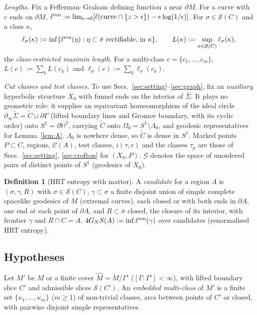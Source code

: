 \documentclass[aps,prd,onecolumn,superscriptaddress,nofootinbib,amsmath,amssymb,11pt]{revtex4-2}
\theoremstyle{definition}
\newtheorem{definition}[theorem]{Definition}
\newcommand{\Hyp}{\mathbb{H}^2}
\newcommand{\Cut}{\mathcal{C}}
\newcommand{\eps}{\epsilon}
\newcommand{\G}{\mathcal{G}}
\begin{document}
\emph{Lengths.} Fix a Fefferman--Graham defining function $z$ near $\partial M$. For a curve with $e$ ends on $\partial M$,
$\ell^{\rm ren}:=\lim_{\eps\to0}[\ell(\text{curve}\cap\{z>\eps\})-e\log(1/\eps)]$. For $\sigma\in\mathcal S(C)$ and a class
$\kappa$,
\[
\ell_\sigma(\kappa):=\inf\{\ell^{\rm ren}(\eta):\eta\subset\bar\sigma\ \text{rectifiable, in }\kappa\},\qquad
L(\kappa):=\sup_{\sigma\in\mathcal S(C)}\ell_\sigma(\kappa),
\]
the \emph{class-restricted maximin length}. For a multi-class $c=\{c_1,\dots,c_m\}$, $L(c):=\sum_kL(c_k)$ and
$\ell_\sigma(c):=\sum_k\ell_\sigma(c_k)$.

\emph{Cut classes and test classes.} To use Secs.~\ref{sec:setting}--\ref{sec:graph}, fix an \emph{auxiliary} hyperbolic
structure $X_0$ with funnel ends on the interior of $\bar\Sigma$. It plays no geometric role: it supplies an equivariant
homeomorphism of the ideal circle $\partial_\infty\tilde\Sigma=\tilde C\sqcup\partial\Gamma$ (lifted boundary lines and
Gromov boundary, with its cyclic order) onto $S^1=\partial\Hyp$, carrying $\tilde C$ onto $\Omega_0=S^1\setminus\Lambda_0$,
and geodesic representatives for Lemma~\ref{lem:A}. $\Lambda_0$ is nowhere dense, so $\tilde C$ is dense in $S^1$. Marked
points $P\subset C$, regions, $\Cut(A)$, test classes, $i(\tau,c)$ and the classes $\tau_p$ are those of
Secs.~\ref{sec:setting}, \ref{sec:crofton} for $(X_0,P)$. $\G$ denotes the space of unordered pairs of distinct points of
$S^1$ (geodesics of $X_0$).

\begin{definition}[HRT entropy with matter]\label{def:HRTmatter}
A \emph{candidate} for a region $A$ is $(\sigma,\gamma,R)$ with $\sigma\in\mathcal S(C)$, $\gamma\subset\sigma$ a finite disjoint
union of simple complete spacelike geodesics of $M$ (extremal curves), each closed or with both ends in $\partial A$, one end
at each point of $\partial A$, and $R\subset\bar\sigma$ closed, the closure of its interior, with frontier $\gamma$ and
$R\cap C=A$. $4G_NS(A):=\inf\ell^{\rm ren}(\gamma)$ over candidates (renormalised HRT entropy).
\end{definition}

\subsection{Hypotheses}

Let $M'$ be $M$ or a finite cover $\widehat M=\tilde M/\Gamma'$ ($[\Gamma:\Gamma']<\infty$), with lifted boundary slice $C'$
and admissible slices $\mathcal S(C')$. An \emph{embedded multi-class} of $M'$ is a finite set $\{\kappa_1,\dots,\kappa_m\}$
($m\ge1$) of non-trivial classes, arcs between points of $C'$ or closed, with pairwise disjoint simple representatives.
\end{document}
